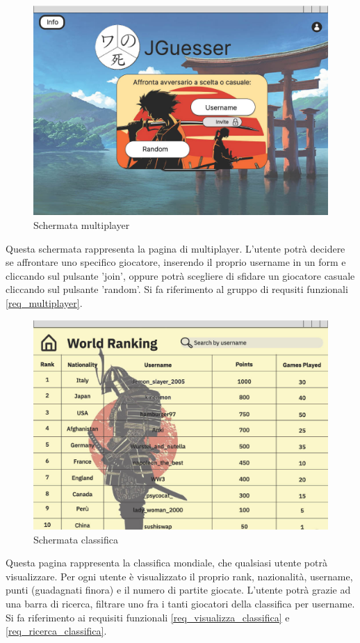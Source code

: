 \begin{figure}[!h]
\centering
\includegraphics[scale=0.35]{images/multiplayer.jpg}
\caption{Schermata multiplayer}
\label{fig:schermata_gioca_multiplayer}
\end{figure}
\noindent
Questa schermata rappresenta la pagina di multiplayer. L'utente potrà decidere se affrontare uno specifico giocatore, inserendo il proprio username in un form e cliccando sul pulsante 'join', oppure potrà scegliere di sfidare un giocatore casuale cliccando sul pulsante 'random'. Si fa riferimento al gruppo di requsiti funzionali \ref{req_multiplayer}.

\begin{figure}[!h]
\centering
\includegraphics[scale=0.35]{images/world_ranking.jpg}
\caption{Schermata classifica}
\label{fig:schermata classifica}
\end{figure}
\noindent
Questa pagina rappresenta la classifica mondiale, che qualsiasi utente potrà visualizzare. Per ogni utente è visualizzato il proprio rank, nazionalità, username, punti (guadagnati finora) e il numero di partite giocate. L'utente potrà grazie ad una barra di ricerca, filtrare uno fra i tanti giocatori della classifica per username. Si fa riferimento ai requisiti funzionali \ref{req_visualizza_classifica} e \ref{req_ricerca_classifica}. 



